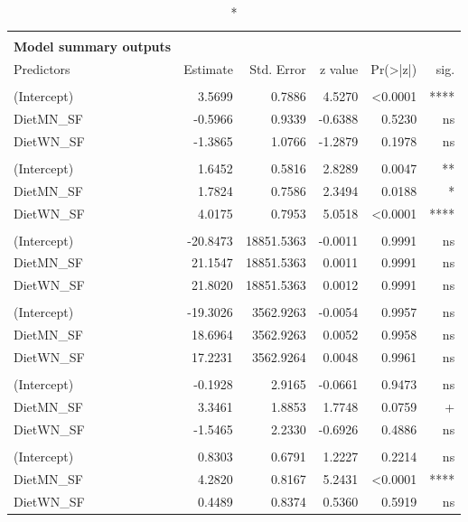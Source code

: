 \documentclass[
  12pt,
  letterpaper,
]{article}
\begin{document}
\begin{longtable}{l|rrrrr}
\caption*{
{\large \textbf{Appendix Table 107}} \\ 
{\small \textbf{Model summary outputs}}
} \\ 
\toprule
\multicolumn{1}{l}{Predictors} & Estimate & Std. Error & z value & Pr(>|z|) & sig. \\ 
\midrule\addlinespace[2.5pt]
\multicolumn{6}{l}{Brain} \\ 
\midrule\addlinespace[2.5pt]
(Intercept) & 3.5699 & 0.7886 & 4.5270 & <0.0001 & **** \\ 
DietMN\_SF & -0.5966 & 0.9339 & -0.6388 & 0.5230 & ns \\ 
DietWN\_SF & -1.3865 & 1.0766 & -1.2879 & 0.1978 & ns \\ 
\midrule\addlinespace[2.5pt]
\multicolumn{6}{l}{Ear} \\ 
\midrule\addlinespace[2.5pt]
(Intercept) & 1.6452 & 0.5816 & 2.8289 & 0.0047 & ** \\ 
DietMN\_SF & 1.7824 & 0.7586 & 2.3494 & 0.0188 & * \\ 
DietWN\_SF & 4.0175 & 0.7953 & 5.0518 & <0.0001 & **** \\ 
\midrule\addlinespace[2.5pt]
\multicolumn{6}{l}{Eye} \\ 
\midrule\addlinespace[2.5pt]
(Intercept) & -20.8473 & 18851.5363 & -0.0011 & 0.9991 & ns \\ 
DietMN\_SF & 21.1547 & 18851.5363 & 0.0011 & 0.9991 & ns \\ 
DietWN\_SF & 21.8020 & 18851.5363 & 0.0012 & 0.9991 & ns \\ 
\midrule\addlinespace[2.5pt]
\multicolumn{6}{l}{Liver} \\ 
\midrule\addlinespace[2.5pt]
(Intercept) & -19.3026 & 3562.9263 & -0.0054 & 0.9957 & ns \\ 
DietMN\_SF & 18.6964 & 3562.9263 & 0.0052 & 0.9958 & ns \\ 
DietWN\_SF & 17.2231 & 3562.9264 & 0.0048 & 0.9961 & ns \\ 
\midrule\addlinespace[2.5pt]
\multicolumn{6}{l}{Paw} \\ 
\midrule\addlinespace[2.5pt]
(Intercept) & -0.1928 & 2.9165 & -0.0661 & 0.9473 & ns \\ 
DietMN\_SF & 3.3461 & 1.8853 & 1.7748 & 0.0759 & + \\ 
DietWN\_SF & -1.5465 & 2.2330 & -0.6926 & 0.4886 & ns \\ 
\midrule\addlinespace[2.5pt]
\multicolumn{6}{l}{Spleen} \\ 
\midrule\addlinespace[2.5pt]
(Intercept) & 0.8303 & 0.6791 & 1.2227 & 0.2214 & ns \\ 
DietMN\_SF & 4.2820 & 0.8167 & 5.2431 & <0.0001 & **** \\ 
DietWN\_SF & 0.4489 & 0.8374 & 0.5360 & 0.5919 & ns \\ 
\bottomrule
\end{longtable}
\end{document}
